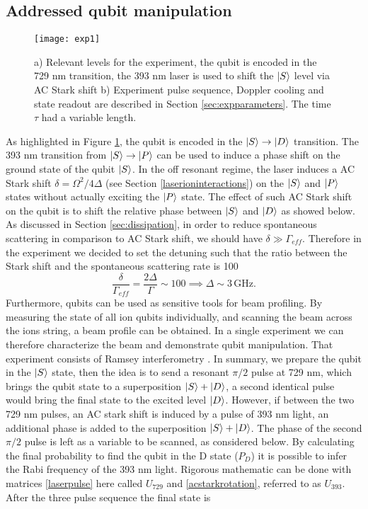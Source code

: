 \subsection{Addressed qubit manipulation}
\label{sec:expqubit}
\begin{figure}
\centering
\texttt{[image: exp1]}
\caption{a) Relevant levels for the experiment, the qubit is encoded in the 729 nm transition, the 393 nm laser is used to shift the $\ket{S}$ level via AC Stark shift b) Experiment pulse sequence, Doppler cooling and state readout are described in Section \ref{sec:expparameters}. The time $\tau$ had a variable length.}
\label{img:qualcosa}
\end{figure}
As highlighted in Figure \ref{img:qualcosa}, the qubit is encoded in the $\ket{S} \to \ket{D}$ transition. The 393 nm transition from $\ket{S}\to \ket{P}$ can be used to induce a phase shift on the ground state of the qubit $\ket{S}$. In the off resonant regime, the laser induces a AC Stark shift $\delta = \Omega^2/4\Delta$ (see Section \ref{laserioninteractions}) on the $\ket{S}$ and $\ket{P}$ states without actually exciting the $\ket{P}$ state. The effect of such AC Stark shift on the qubit is to shift the relative phase between $\ket{S}$ and $\ket{D}$ as showed below. As discussed in Section \ref{sec:dissipation}, in order to reduce spontaneous scattering in comparison to AC Stark shift, we should have $\delta \gg \Gamma_{eff}$. Therefore in the experiment we decided to set the detuning such that the ratio between the Stark shift and the spontaneous scattering rate is 100
\begin{equation}
\frac{\delta}{\Gamma_{eff}} = \frac{2\Delta}{\Gamma} \sim 100 \implies \Delta \sim 3\,\text{GHz}.
\end{equation}
Furthermore, qubits can be used as sensitive tools for beam profiling. By measuring the state of all ion qubits individually, and scanning the beam across the ions string, a beam profile can be obtained. In a single experiment we can therefore characterize the beam and demonstrate qubit manipulation.
That experiment consists of Ramsey interferometry \cite{Ramsey1950}. In summary, we prepare the qubit in the $\ket{S}$ state, then the idea is to send a resonant $\pi/2$ pulse at 729 nm, which brings the qubit state to a superposition $\ket{S}+\ket{D}$, a second identical pulse would bring the final state to the excited level $\ket{D}$. However, if between the two 729 nm pulses, an AC stark shift is induced by a pulse of 393 nm light, an additional phase is added to the superposition $\ket{S}+\ket{D}$. The phase of the second $\pi/2$ pulse is left as a variable to be scanned, as considered below. By calculating the final probability to find the qubit in the D state ($P_D$) it is possible to infer the Rabi frequency of the 393 nm light. Rigorous mathematic can be done with matrices \eqref{laserpulse} here called $U_{729}$ and \eqref{acstarkrotation}, referred to as $U_{393}$. After the three pulse sequence the final state is
